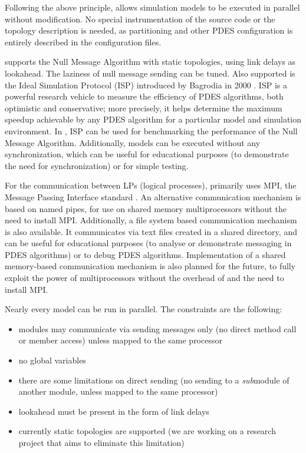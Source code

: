 Following the above principle, {\opp} allows simulation models
to be executed in parallel without modification. No special instrumentation
of the source code or the topology description is needed,
as partitioning and other PDES configuration is entirely described
in the configuration files.

{\opp} supports the Null Message Algorithm with static
topologies, using link delays as lookahead. The laziness of null message
sending can be tuned. Also supported is the Ideal Simulation Protocol
(ISP) introduced by Bagrodia in 2000 \cite{bagrodia00}. ISP is
a powerful research vehicle to measure the efficiency of
PDES algorithms, both optimistic and conservative;
more precisely, it helps determine the maximum speedup achievable
by any PDES algorithm for a particular model and simulation environment.
In {\opp}, ISP can be used for benchmarking the performance of the
Null Message Algorithm.
Additionally, models can be executed without any synchronization, which
can be useful for educational purposes (to demonstrate the need for
synchronization) or for simple testing.

For the communication between LPs (logical processes), {\opp}
primarily uses MPI, the Message Passing Interface standard
\cite{mpiforum94}.  An alternative communication mechanism is based on
named pipes, for use on shared memory multiprocessors without the need
to install MPI.  Additionally, a file system based communication mechanism
is also available. It communicates via text files created in a shared
directory, and can be useful for educational purposes (to analyse or
demonstrate messaging in PDES algorithms) or to debug PDES algorithms.
Implementation of a shared memory-based communication mechanism is also planned
for the future, to fully exploit the power of multiprocessors without
the overhead of and the need to install MPI.

Nearly every model can be run in parallel. The constraints are the following:
\begin{itemize}
  \item{modules may communicate via sending messages only (no direct method call
        or member access) unless mapped to the same processor}
  \item{no global variables}
  \item{there are some limitations on direct sending (no sending to a \textit{sub}module
        of another module, unless mapped to the same processor)}
  \item{lookahead must be present in the form of link delays}
  \item{currently static topologies are supported (we are working on a
      research project that aims to eliminate this limitation)}
\end{itemize}

